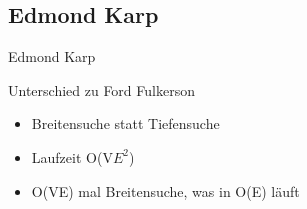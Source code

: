 \subsection{Edmond Karp}
\begin{frame}{Edmond Karp}
  \begin{block}{Unterschied zu Ford Fulkerson}
    \begin{itemize}
      \item Breitensuche statt Tiefensuche
      \pause
      \item Laufzeit O(V$E^2$)
      \pause
      \item O(VE) mal Breitensuche, was in O(E) läuft
    \end{itemize}
  \end{block}
\end{frame}
